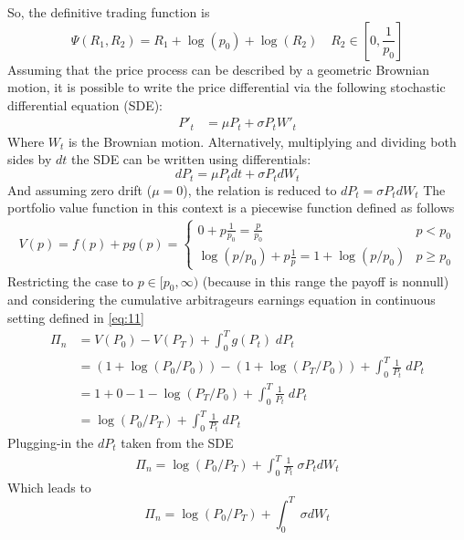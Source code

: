 \documentclass[12pt]{article}
\begin{document}
So, the definitive trading function is
\begin{equation}
    \Psi(R_1,R_2) = R_1 + \log(p_0) + \log(R_2) \quad R_2 \in \left[0, \frac{1}{p_0}\right]
\end{equation}
Assuming that the price process can be described by a geometric Brownian motion, it is possible to write the price differential via the following stochastic differential equation (SDE):
\begin{align*}
    P'_t & = \mu P_t + \sigma P_tW'_t
\end{align*}
Where $W_t$ is the Brownian motion. Alternatively, multiplying and dividing both sides by $dt$ the SDE can be written using differentials:
\begin{equation}
    dP_t = \mu P_t dt + \sigma P_t dW_t
\end{equation}
And assuming zero drift ($\mu=0$), the relation is reduced to $dP_t = \sigma P_t dW_t$
The portfolio value function in this context is a piecewise function defined as follows
\begin{align*}
    V(p) = f(p) +pg(p) = \begin{cases}
                             0 +p\frac{1}{p_0} = \frac{p}{p_0}           & p<p_0     \\
                             \log(p/p_0) + p\frac{1}{p} = 1+ \log(p/p_0) & p\geq p_0
                         \end{cases}
\end{align*}
Restricting the case to $p\in[p_0,\infty)$ (because in this range the payoff is nonnull) and considering the cumulative arbitrageurs earnings equation in continuous setting defined in \eqref{eq:11}
\begin{align*}
    \Pi_n & = V(P_0) -V(P_T) +     \int_{0}^{T}g(P_t)  \; dP_t                       \\
          & =(1+\log(P_0/P_0))-(1+\log(P_T/P_0)) + \int_{0}^{T}\frac{1}{P_t} \; dP_t \\
          & =1+0-1-\log(P_T/P_0) + \int_{0}^{T}\frac{1}{P_t} \; dP_t                 \\
          & =\log(P_0/P_T) + \int_{0}^{T}\frac{1}{P_t} \; dP_t
\end{align*}
Plugging-in the $dP_t$ taken from the SDE
\begin{align*}
    \Pi_n =\log(P_0/P_T) + \int_{0}^{T}\frac{1}{P_t} \; \sigma P_t dW_t
\end{align*}
Which leads to
\begin{equation}
    \Pi_n =\log(P_0/P_T) + \int_{0}^{T} \; \sigma dW_t
\end{equation}
\end{document}
